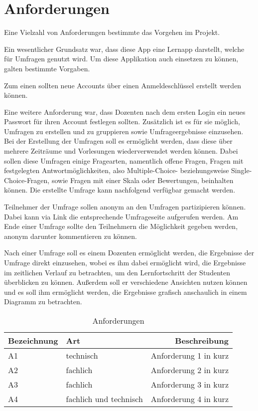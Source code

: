 \section{Anforderungen}

Eine Vielzahl von Anforderungen bestimmte das Vorgehen im Projekt.

Ein wesentlicher Grundsatz war, dass diese App eine Lernapp darstellt, welche für Umfragen genutzt wird.
Um diese Applikation auch einsetzen zu können, galten bestimmte Vorgaben.

Zum einen sollten neue Accounts über einen Anmeldeschlüssel erstellt werden können.

Eine weitere Anforderung war, dass Dozenten nach dem ersten Login ein neues Passwort für ihren Account festlegen sollten.
Zusätzlich ist es für sie möglich, Umfragen zu erstellen und zu gruppieren sowie Umfrageergebnisse einzusehen.
Bei der Erstellung der Umfragen soll es ermöglicht werden, dass diese über mehrere Zeiträume und Vorlesungen wiederverwendet werden können.
Dabei sollen diese Umfragen einige Fragearten, namentlich offene Fragen, Fragen mit festgelegten Antwortmöglichkeiten, also Multiple-Choice- beziehungsweise Single-Choice-Fragen, sowie Fragen mit einer Skala oder Bewertungen, beinhalten können.
Die erstellte Umfrage kann nachfolgend verfügbar gemacht werden.

Teilnehmer der Umfrage sollen anonym an den Umfragen partizipieren können. Dabei kann via Link die entsprechende Umfrageseite aufgerufen werden. Am Ende einer Umfrage sollte den Teilnehmern die Möglichkeit gegeben werden, anonym darunter kommentieren zu können.

Nach einer Umfrage soll es einem Dozenten ermöglicht werden, die Ergebnisse der Umfrage direkt einzusehen, wobei es ihm dabei ermöglicht wird, die Ergebnisse im zeitlichen Verlauf zu betrachten, um den Lernfortschritt der Studenten überblicken zu können.
Außerdem soll er verschiedene Ansichten nutzen können und es soll ihm ermöglicht werden, die Ergebnisse grafisch anschaulich in einem Diagramm zu betrachten.



\begin{table}[!htbp]
    \centering
    \begin{tabularx}{\textwidth}{l|k|r}
      \toprule
      {Bezeichnung} & {Art} & {Beschreibung} \\
      \midrule
      {\label{Anf:A1}A1} & technisch & Anforderung 1 in kurz \\
      \hline
      {\label{Anf:A2}A2} & fachlich & Anforderung 2 in kurz \\
      \hline
      {\label{Anf:A3}A3} & fachlich & Anforderung 3 in kurz \\
      \hline
      {\label{Anf:A4}A4} & fachlich und technisch & Anforderung 4 in kurz \\
      \bottomrule
    \end{tabularx}
    \caption{Anforderungen}
    \label{tab:Anforderungen}
\end{table}